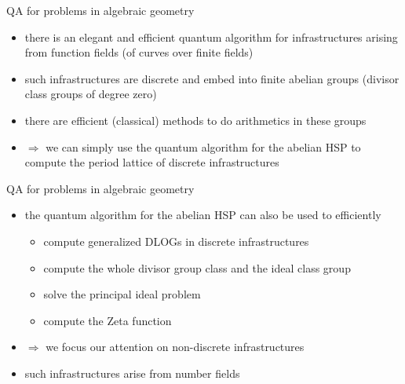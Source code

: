 \documentclass[slideColor]{prosper}
\renewcommand{\>}{\rangle}
\newcommand{\<}{\langle}
\begin{document}

\begin{slide}{QA for problems in algebraic geometry}
\begin{itemize}
\item there is an elegant and efficient quantum algorithm for infrastructures arising from function fields (of curves over finite fields)

\medskip
\item such infrastructures are discrete and embed into finite abelian groups (divisor class groups of degree zero)

\medskip
\item there are efficient (classical) methods to do arithmetics in these groups

\medskip
\item $\Rightarrow$ we can simply use the quantum algorithm for the abelian HSP to compute the period lattice of discrete infrastructures

\end{itemize}

\end{slide}


\begin{slide}{QA for problems in algebraic geometry}
\vspace{-0.2cm}
\begin{itemize}
\item the quantum algorithm for the abelian HSP can also be used to efficiently

\medskip
\begin{itemize}
\item compute generalized DLOGs in discrete infrastructures

\medskip
\item compute the whole divisor group class and the ideal class group

\medskip
\item solve the principal ideal problem

\medskip
\item compute the Zeta function

\end{itemize}

\medskip
\item $\Rightarrow$ we focus our attention on non-discrete infrastructures

\medskip
\item such infrastructures arise from number fields

\end{itemize}

\end{slide}
\end{document}
